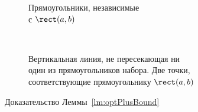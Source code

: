 \begin{figure} \centering
\begin{subfigure}[m]{0.42\textwidth} \centering
\caption{Прямоугольники, независимые \\ с $\rect (a,b)$}
\label{fig:rectCases}
\end{subfigure}\ \ \ 
\begin{subfigure}[m]{0.5\textwidth} \centering
\caption{Вертикальная линия, не пересекающая ни \\
	один из прямоугольников набора. Две точки, \\
	соответствующие прямоугольнику $\rect (a,b)$}
\label{fig:rectPQ}
\end{subfigure}
     \caption{Доказательство Леммы~\ref{lm:optPlusBound}}
\end{figure}